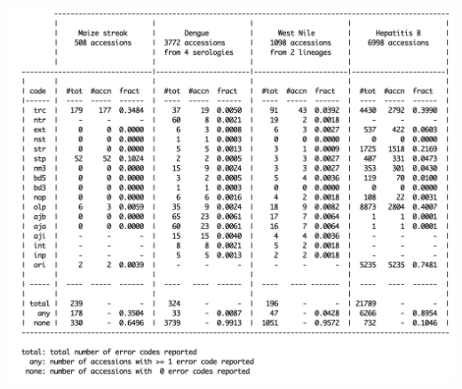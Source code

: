 \documentclass[landscape]{slides}
\begin{document}
\begin{slide}
\begin{center}
\includegraphics[height=8in]{figs/pilot-errcode-table-4}
\vfill
\end{center}
\end{slide}
\end{document}

